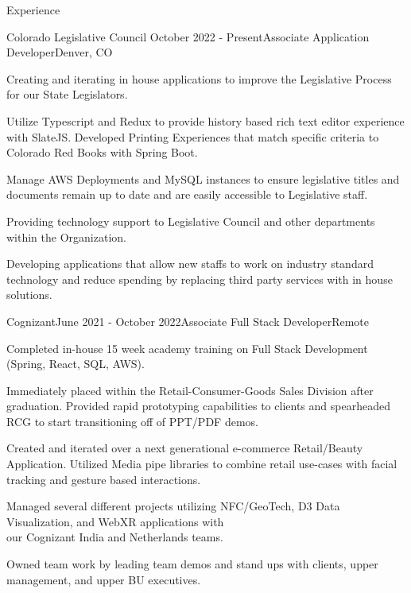 \documentclass[
	11pt, %
]{resume} %
\begin{document}

\begin{rSection}{Experience}

	\begin{rSubsection}{Colorado Legislative Council }{October 2022 - Present}{Associate Application Developer}{Denver, CO}
		\item Creating and iterating in house applications to improve the Legislative Process for our State Legislators.
		\item Utilize Typescript and Redux to provide history based rich text editor experience with SlateJS. Developed Printing Experiences that match specific criteria to Colorado Red Books with Spring Boot. 
		\item Manage AWS Deployments and MySQL instances to ensure legislative titles and documents remain up to date and are easily accessible to Legislative staff.
		\item Providing technology support to Legislative Council and other departments within the Organization.
		\item Developing applications that allow new staffs to work on industry standard technology and reduce spending by replacing third party services with in house solutions. 
	\end{rSubsection}


	\begin{rSubsection}{Cognizant}{June 2021 - October 2022}{Associate Full Stack Developer}{Remote}
		\item Completed in-house 15 week academy training on Full Stack Development (Spring, React, SQL, AWS).
		\item Immediately placed within the Retail-Consumer-Goods Sales Division after graduation. Provided rapid prototyping capabilities to clients and spearheaded RCG to start transitioning off of PPT/PDF demos.
		\item Created and iterated over a next generational e-commerce Retail/Beauty Application. Utilized Media pipe libraries to combine retail use-cases with facial tracking and gesture based interactions.
		\item Managed several different projects utilizing NFC/GeoTech, D3 Data Visualization, and WebXR applications with \\ our Cognizant India and Netherlands teams.
		\item Owned team work by leading team demos and stand ups with clients, upper management, and upper BU executives.
	\end{rSubsection}

\end{rSection}
\end{document}
